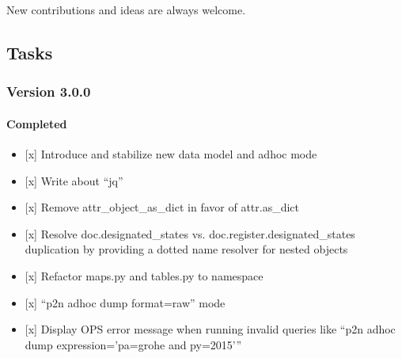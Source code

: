 \documentclass[letterpaper,10pt,english]{sphinxmanual}
\begin{document}
New contributions and ideas are always welcome.


\subsection{Tasks}
\label{\detokenize{todo:tasks}}

\subsubsection{Version 3.0.0}
\label{\detokenize{todo:version-3-0-0}}

\paragraph{Completed}
\label{\detokenize{todo:completed}}\begin{itemize}
\item {} 
{[}x{]} Introduce and stabilize new data model and ad\sphinxhyphen{}hoc mode

\item {} 
{[}x{]} Write about “jq”

\item {} 
{[}x{]} Remove attr\_object\_as\_dict in favor of attr.as\_dict

\item {} 
{[}x{]} Resolve doc.designated\_states vs. doc.register.designated\_states duplication by providing a dotted name resolver for nested objects

\item {} 
{[}x{]} Refactor maps.py and tables.py to  namespace

\item {} 
{[}x{]} “p2n adhoc dump \textendash{}format=raw” mode

\item {} 
{[}x{]} Display OPS error message when running invalid queries like “p2n adhoc dump \textendash{}expression=’pa=grohe and py=2015’”

\end{itemize}
\end{document}
